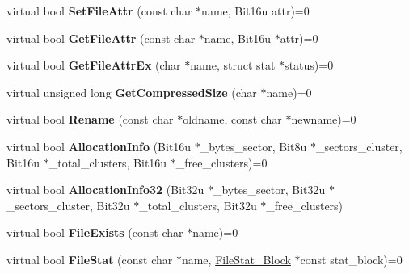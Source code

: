 \begin{DoxyCompactItemize}
\item 
\hypertarget{classDOS__Drive_a9551484da430c2c151836568ce65a0ae}{virtual bool {\bfseries Set\-File\-Attr} (const char $\ast$name, Bit16u attr)=0}\label{classDOS__Drive_a9551484da430c2c151836568ce65a0ae}

\item 
\hypertarget{classDOS__Drive_aff8f34bd9601bceeeb587fd0e4cd51bf}{virtual bool {\bfseries Get\-File\-Attr} (const char $\ast$name, Bit16u $\ast$attr)=0}\label{classDOS__Drive_aff8f34bd9601bceeeb587fd0e4cd51bf}

\item 
\hypertarget{classDOS__Drive_a938a47bb4008e40e4c808b6c89bac56d}{virtual bool {\bfseries Get\-File\-Attr\-Ex} (char $\ast$name, struct stat $\ast$status)=0}\label{classDOS__Drive_a938a47bb4008e40e4c808b6c89bac56d}

\item 
\hypertarget{classDOS__Drive_adc4d2fc3fd13bef5fb78dfa3941b746a}{virtual unsigned long {\bfseries Get\-Compressed\-Size} (char $\ast$name)=0}\label{classDOS__Drive_adc4d2fc3fd13bef5fb78dfa3941b746a}

\item 
\hypertarget{classDOS__Drive_a1329723ca172ad17e932caeb052469e8}{virtual bool {\bfseries Rename} (const char $\ast$oldname, const char $\ast$newname)=0}\label{classDOS__Drive_a1329723ca172ad17e932caeb052469e8}

\item 
\hypertarget{classDOS__Drive_a5e15b725bcef2e78fd17fad8981b560d}{virtual bool {\bfseries Allocation\-Info} (Bit16u $\ast$\-\_\-bytes\-\_\-sector, Bit8u $\ast$\-\_\-sectors\-\_\-cluster, Bit16u $\ast$\-\_\-total\-\_\-clusters, Bit16u $\ast$\-\_\-free\-\_\-clusters)=0}\label{classDOS__Drive_a5e15b725bcef2e78fd17fad8981b560d}

\item 
\hypertarget{classDOS__Drive_aff3f7c4f24a63e0f832f1a9a2c8eab3e}{virtual bool {\bfseries Allocation\-Info32} (Bit32u $\ast$\-\_\-bytes\-\_\-sector, Bit32u $\ast$\-\_\-sectors\-\_\-cluster, Bit32u $\ast$\-\_\-total\-\_\-clusters, Bit32u $\ast$\-\_\-free\-\_\-clusters)}\label{classDOS__Drive_aff3f7c4f24a63e0f832f1a9a2c8eab3e}

\item 
\hypertarget{classDOS__Drive_ac40baf5634ab1e58e38d0dda0dff3afb}{virtual bool {\bfseries File\-Exists} (const char $\ast$name)=0}\label{classDOS__Drive_ac40baf5634ab1e58e38d0dda0dff3afb}

\item 
\hypertarget{classDOS__Drive_a9e38d58283c5e54845e81751e36b646e}{virtual bool {\bfseries File\-Stat} (const char $\ast$name, \hyperlink{structFileStat__Block}{File\-Stat\-\_\-\-Block} $\ast$const stat\-\_\-block)=0}\label{classDOS__Drive_a9e38d58283c5e54845e81751e36b646e}


\end{DoxyCompactItemize}
